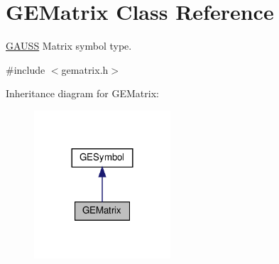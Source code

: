 \hypertarget{class_g_e_matrix}{}\section{G\+E\+Matrix Class Reference}
\label{class_g_e_matrix}


\hyperlink{class_g_a_u_s_s}{G\+A\+U\+SS} Matrix symbol type.  




{\ttfamily \#include $<$gematrix.\+h$>$}



Inheritance diagram for G\+E\+Matrix\+:\nopagebreak
\begin{figure}[H]
\begin{center}
\leavevmode
\includegraphics[width=144pt]{class_g_e_matrix__inherit__graph}
\end{center}
\end{figure}
